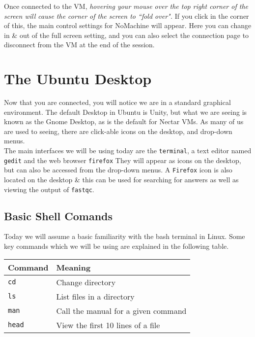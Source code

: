 \begin{information}
Once connected to the VM, \textit{hovering your mouse over the top right corner of the screen will cause the corner of the screen to ``fold over".}
If you click in the corner of this, the main control settings for NoMachine will appear.
Here you can change in \& out of the full screen setting, and you can also select the connection page to disconnect from the VM at the end of the session.
\end{information}

\section{The Ubuntu Desktop}
\begin{note}
Now that you are connected, you will notice we are in a standard graphical environment.
The default Desktop in Ubuntu is Unity, but what we are seeing is known as the Gnome Desktop, as is the default for Nectar VMs.
As many of us are used to seeing, there are click-able icons on the desktop, and drop-down menus. \\

The main interfaces we will be using today are the \texttt{terminal}, a text editor named \texttt{gedit} and the web browser \texttt{firefox}
They will appear as icons on the desktop, but can also be accessed from the drop-down menus.
A \texttt{Firefox} icon is also located on the desktop \& this can be used for searching for answers as well as viewing the output of \texttt{fastqc}.
\end{note}

\subsection{Basic Shell Comands}
\begin{note}
Today we will assume a basic familiarity with the bash terminal in Linux.
Some key commands which we will be using are explained in the following table.
\end{note}
\begin{center}
  \begin{tabular}[h]{|p{3cm} | p{11.5cm} |}
    \hline
    \textbf{Command} & \textbf{Meaning} \\
    \hline
    \texttt{cd} & Change directory \\
    \texttt{ls} & List files in a directory \\
    \texttt{man} & Call the manual for a given command \\
    \texttt{head} & View the first 10 lines of a file \\
    \hline
  \end{tabular}
\end{center}

